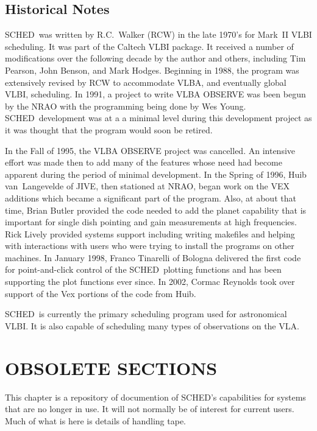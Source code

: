 \documentclass{report}
\newcommand{\schedb}{{\sc SCHED~}}
\begin{document}
\section{\label{SEC:HIST}Historical Notes}

\schedb was written by R.C.~Walker (RCW) in the late 1970's for Mark~II VLBI
scheduling. It was part of the Caltech VLBI package.  It received a
number of modifications over the following decade by the author and
others, including Tim Pearson, John Benson, and Mark Hodges. Beginning
in 1988, the program was extensively revised by RCW to accommodate
VLBA, and eventually global VLBI, scheduling.  In 1991, a project to
write {\sc VLBA OBSERVE} was been begun by the NRAO with the
programming being done by Wes Young.  \schedb development was at a a
minimal level during this development project as it was thought that
the program would soon be retired.

In the Fall of 1995, the {\sc VLBA OBSERVE} project was cancelled.  An
intensive effort was made then to add many of the features whose need
had become apparent during the period of minimal development.  In the
Spring of 1996, Huib van~Langevelde of JIVE, then stationed at NRAO,
began work on the VEX additions which became a significant part
of the program.  Also, at about that time, Brian Butler provided the
code needed to add the planet capability that is important for single
dish pointing and gain measurements at high frequencies.  Rick Lively
provided systems support including writing makefiles and helping with
interactions with users who were trying to install the programs on
other machines.  In January 1998, Franco Tinarelli of Bologna delivered
the first code for point-and-click control of the \schedb plotting
functions and has been supporting the plot functions ever since.  In
2002, Cormac Reynolds took over support of the Vex portions of the
code from Huib.

\schedb is currently the primary scheduling program used for
astronomical VLBI.  It is also capable of scheduling many types
of observations on the VLA.

\chapter{\label{APP:OBSOLETE}OBSOLETE SECTIONS}

This chapter is a repository of documention of SCHED's capabilities
for systems that are no longer in use.  It will not normally be of
interest for current users.  Much of what is here is details of
handling tape.
\end{document}
